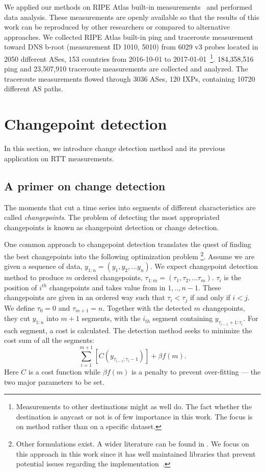 We applied our methods on RIPE Atlas built-in measurements~\cite{atlas} and performed data analysis.
These measurements are openly available so that the results of this work can be reproduced by other researchers or compared to alternative approaches.
We collected RIPE Atlas built-in ping and traceroute measurement toward DNS b-root (measurement ID 1010, 5010) from 6029 v3 probes located in 2050 different ASes, 153 countries from 2016-10-01 to 2017-01-01~\footnote{Measurements to other destinations might as well do. The fact whether the destination is anycast or not is of few importance in this work. The focus is on method rather than on a specific dataset.}.
184,358,516 ping and 23,507,910 traceroute measurements are collected and analyzed.
The traceroute measurements flowed through 3036 ASes, 120 IXPs, containing 10720 different AS paths.


\section{Changepoint detection}
\label{sec:cpt}
In this section, we introduce change detection method and its previous application on RTT measurements.

\subsection{A primer on change detection}
The moments that cut a time series into segments of different characteristics are called \textit{changepoints}.
The problem of detecting the most appropriated changepoints is known as changepoint detection or change detection.

One common approach to changepoint detection translates the quest of finding the best changepoints into the following optimization problem \footnote{Other formulations exist. A wider literature can be found in \cite{Haynes2016, Eckley2011}. We focus on this approach in this work since it has well maintained libraries that prevent potential issues regarding the implementation~\cite{Killick2013a, Haynes2016}.}.
Assume we are given a sequence of data, $y_{1:n} = (y_1, y_2,...y_n)$.
We expect changepoint detection method to produce $m$ ordered changepoints, $\tau_{1:m} = (\tau_1, \tau_2,...\tau_m)$.
$\tau_i$ is the position of $i^{th}$ changepoints and takes value from in ${1,..,n-1}$.
These changepoints are given in an ordered way such that $\tau_i < \tau_j$ if and only if $i < j$.
We define $\tau_0 = 0$ and $\tau_{m+1} = n$.
Together with the detected $m$ changepoints, they cut $y_{1:n}$ into $m+1$ segments, with the $i_{th}$ segment containing $y_{\tau_{i-1}+1:\tau_i}$.
For each segment, a cost is calculated. The detection method seeks to minimize the cost sum of all the segments: 
\begin{equation}
\sum_{i=1}^{m+1}[C(y_{\tau_{i-1}:\tau_i-1})] + \beta f(m).
\end{equation}
Here $C$ is a cost function while $\beta f(m)$ is a penalty to prevent over-fitting ---  the two major parameters to be set.

